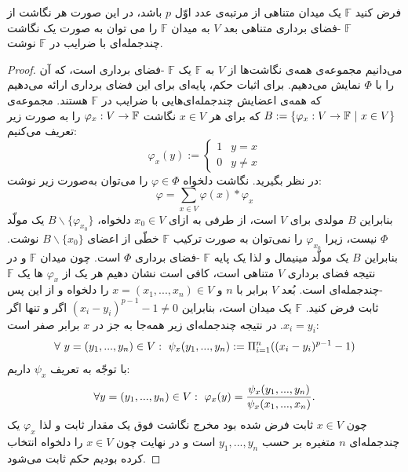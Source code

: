 \begin{lemma}
	\label{unimaplem1}
	فرض کنید 
$\mathbb{F}$
یک میدان متناهی از مرتبه‌ی عدد اوّل 
$p$
باشد، در این صورت هر نگاشت از 
$\mathbb{F}$
-فضای برداری متناهی بعد 
$V$
 به میدان 
 $\mathbb{F}$
 را می توان به صورت یک نگاشت چندجمله‌ای با ضرایب در 
 $\mathbb{F}$
 نوشت.
 
 \begin{proof}
 	می‌دانیم مجموعه‌ی همه‌ی نگاشت‌ها از 
 	$V$
 	به 
 	$\mathbb{F}$
 	یک 
 	$\mathbb{F}$
-فضای برداری است، که آن را با 
 	$\varPhi$
 	نمایش می‌دهیم. برای اثبات حکم، پایه‌ای برای این فضای برداری ارائه می‌دهیم که همه‌ی اعضایش چندجمله‌ای‌هایی با ضرایب در 
 	$\mathbb{F}$
 	هستند. مجموعه‌ی 
 		$B:=\{\varphi_{x}:V\rightarrow \mathbb{F} \ | \ x\in V\}$
 	 که برای هر 
 	$x\in V$
 	نگاشت 
 	$\varphi_{x}:V\rightarrow \mathbb{F}$
 	را به صورت زیر تعریف می‌کنیم:
\begin{equation*}
\varphi_{x}(y):=
\left\{
\begin{array}{lr}
1   & y = x \\‎ 
0  & y\neq x
\end{array}\right.
\end{equation*}
 در نظر بگیرید. نگاشت دلخواه  
 $\varphi\in\varPhi$
را می‌توان به‌صورت زیر نوشت:
$$\varphi = \sum_{x\in V}\varphi(x)*\varphi_{x}$$
بنابراین 
$B$
 مولدی برای 
 $V$
 است، از طرفی به ازای 
 $x_{0}\in V$
 دلخواه، 
 $B\backslash\{\varphi_{x_{0}}\}$
 یک مولّد 
 $\varPhi$
 نیست، زیرا 
 $\varphi_{x_{0}}$
 را نمی‌توان به صورت ترکیب 
 $\mathbb{F}$
 خطّی از اعضای 
 $B\backslash\{x_{0}\}$
 نوشت. بنابراین  
 $B$
 یک مولّد مینیمال و لذا یک پایه 
 $\mathbb{F}$
 -فضای برداری 
 $\varPhi$
 است. چون میدان 
 $\mathbb{F}$
 و در نتیجه فضای برداری 
 $V$
 متناهی است، کافی است نشان دهیم هر یک از  
 $\varphi_{x}$
 ها یک 
 $\mathbb{F}$
-چندجمله‌ای است. بُعد 
$V$
برابر با 
$n$
 و 
$x = (x_{1},..., x_{n})\in V$
را دلخواه و از این پس ثابت فرض کنید. 
$\mathbb{F}$
 یک میدان است، بنابراین 
 $(x_{i}-y_{i})^{p-1} - 1 \neq 0$
  اگر و تنها اگر 
  $x_{i} = y_{i}$.  
در نتیجه چندجمله‌ای زیر همه‌جا به جز در 
$x$
برابر صفر است:
$$\forall \ y = (y_{1},..., y_{n})\in V: \ \psi_{x}(y_{1},..., y_{n}) := \Pi_{i = 1}^{n}((x_{i}-y_{i})^{p-1} - 1)$$
با توجّه به تعریف 
$\psi_{x}$
داریم:
$$\fa y = (y_{1},...,y_{n})\in V : \ \varphi_{x}(y) = \frac{\psi_{x}(y_{1},..., y_{n})}{\psi_{x}(x_{1},..., x_{n})}.$$
چون 
$x\in V$
ثابت فرض شده بود مخرج نگاشت فوق یک مقدار ثابت و لذا 
$\varphi_{x}$
یک چندجمله‌ای 
$n$
متغیره بر حسب 
$y_{1},..., y_{n}$
است و در نهایت چون 
$x\in V$
را دلخواه انتخاب کرده بودیم حکم ثابت می‌شود.
 \end{proof}
\end{lemma}

